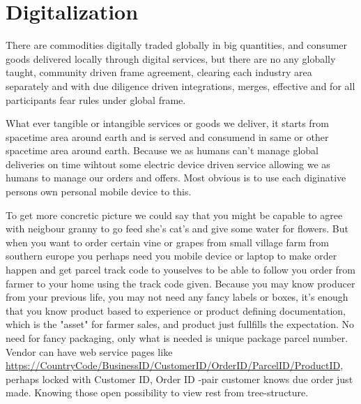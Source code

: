 \section{Digitalization}
\label{digitalization}
There are commodities digitally traded globally in big quantities, and consumer
goods delivered locally through digital services, but there are no any globally
taught, community driven frame agreement, clearing each industry area
separately and with due diligence driven integrations, merges, effective and
for all participants fear rules under global frame.

What ever tangible or intangible services or goods we deliver, it starts from
spacetime area around earth and is served and consumend in same or other
spacetime area around earth. Because we as humans can't manage global
deliveries on time wihtout some electric device driven service allowing we as
humans to manage our orders and offers. Most obvious is to use each diginative
persons own personal mobile device to this.

To get more concretic picture we could say that you might be capable to agree
with neigbour granny to go feed she's cat's and give some water for flowers.
But when you want to order certain vine or grapes from small village farm from
southern europe you perhaps need you mobile device or laptop to make order
happen and get parcel track code to youselves to be able to follow you order
from farmer to your home using the track code given. Because you may know
producer from your previous life, you may not need any fancy labels or boxes,
it's enough that you know product based to experience or product defining
documentation, which is the "asset" for farmer sales, and product just
fullfills the expectation. No need for fancy packaging, only what is needed is
unique package parcel number. Vendor can have web service pages like
\url{https://CountryCode/BusinessID/CustomerID/OrderID/ParcelID/ProductID},
perhaps locked with Customer ID, Order ID -pair customer knows due order
just made. Knowing those open possibility to view rest from tree-structure.

